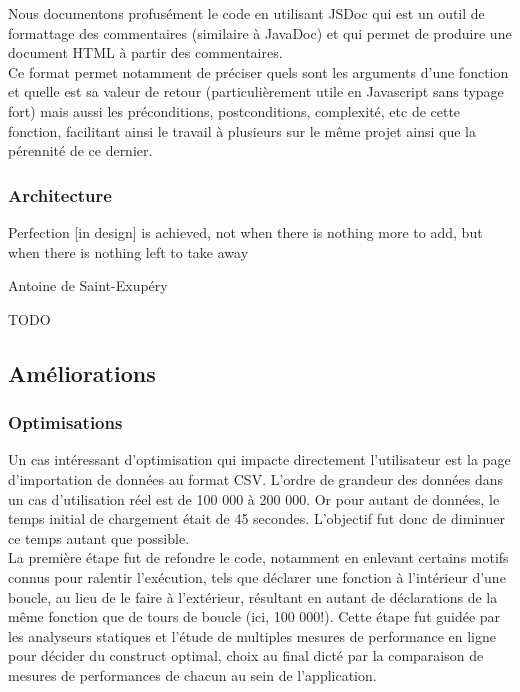 \documentclass[a4paper,french,12pt]{article}
\begin{document}
		Nous documentons profusément le code en utilisant JSDoc qui est un outil de formattage des commentaires (similaire à JavaDoc) et qui permet de produire une document HTML à partir des commentaires.~\\	
		
	Ce format permet notamment de préciser quels sont les arguments d'une fonction et quelle est sa valeur de retour (particulièrement utile en Javascript sans typage fort) mais aussi les préconditions, postconditions, complexité, etc de cette fonction, facilitant ainsi le travail à plusieurs sur le même projet ainsi que la pérennité de ce dernier.

	\subsubsection{Architecture}
	\epigraph{Perfection [in design] is achieved, not when there is nothing more to add, but when there is nothing left to take away}{Antoine de Saint-Exupéry}
	TODO


  \subsection{Améliorations}
	\subsubsection{Optimisations}
	Un cas intéressant d'optimisation qui impacte directement l'utilisateur est la page d'importation de données au format CSV.
	L'ordre de grandeur des données dans un cas d'utilisation réel est de 100 000 à 200 000. Or pour autant de données, le temps initial de chargement était de 45 secondes. L'objectif fut donc de diminuer ce temps autant que possible.~\\	
	
	La première étape fut de refondre le code, notamment en enlevant certains motifs connus pour ralentir l'exécution, tels que déclarer une fonction à l'intérieur d'une boucle, au lieu de le faire à l'extérieur, résultant en autant de déclarations de la même fonction que de tours de boucle (ici, 100 000!). Cette étape fut guidée par les analyseurs statiques et l'étude de multiples mesures de performance en ligne pour décider du construct optimal, choix au final dicté par la comparaison de mesures de performances de chacun au sein de l'application.~\\	
	
\end{document}
